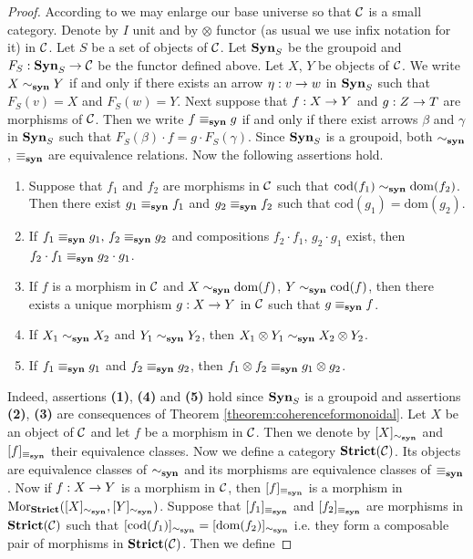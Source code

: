 \begin{proof}
According to {\cite[Introduction]{Presheaves}} we may enlarge our base universe so that ${\mathcal C}$ is a small category. Denote by $I$ unit and by $\otimes$ functor (as usual we use infix notation for it) in ${\mathcal C}$. Let $S$ be a set of objects of ${\mathcal C}$. Let $\mathbf{Syn}_S$ be the groupoid and $F_S:\mathbf{Syn}_S\rightarrow {\mathcal C}$ be the functor defined above. Let $X$, $Y$ be objects of ${\mathcal C}$. We write $X\sim_{\mathbf{syn}}Y$ if and only if there exists an arrow $\eta:v\rightarrow w$ in $\mathbf{Syn}_S$ such that $F_S(v)=X$ and $F_S(w)=Y$. Next suppose that $f:X\rightarrow Y$ and $g:Z\rightarrow T$ are morphisms of ${\mathcal C}$. Then we write $f \equiv_{\mathbf{syn}}g$ if and only if there exist arrows $\beta$ and $\gamma$ in $\mathbf{Syn}_S$ such that $F_S(\beta)\cdot f = g\cdot F_S(\gamma)$. Since $\mathbf{Syn}_S$ is a groupoid, both $\sim_{\mathbf{syn}}$, $\equiv_{\mathbf{syn}}$ are equivalence relations. Now the following assertions hold.
\begin{enumerate}[label=\textbf{(\arabic*)}, leftmargin=1.5em]
\item Suppose that $f_1$ and $f_2$ are morphisms in ${\mathcal C}$ such that $\mathrm{cod}(f_1) \sim_{\mathbf{syn}} \mathrm{dom}(f_2)$. Then there exist $g_1 \equiv_{\mathbf{syn}} f_1$ and $g_2\equiv_{\mathbf{syn}} f_2$ such that $\mathrm{cod}(g_1)=\mathrm{dom}(g_2)$. 
\item If $f_1\equiv_{\mathbf{syn}} g_1,\, f_2\equiv_{\mathbf{syn}} g_2$ and compositions $f_2\cdot f_1,\,g_2\cdot g_1$ exist, then $f_2\cdot f_1\equiv_{\mathbf{syn}}g_2\cdot g_1$.
\item If $f$ is a morphism in ${\mathcal C}$ and $X\sim_{\mathbf{syn}} \mathrm{dom}(f)$, $Y\sim_{\mathbf{syn}} \mathrm{cod}(f)$, then there exists a unique morphism $g:X\rightarrow Y$ in ${\mathcal C}$ such that $g \equiv_{\mathbf{syn}} f$.
\item If $X_1\sim_{\mathbf{syn}}X_2$ and $Y_1\sim_{\mathbf{syn}} Y_2$, then $X_1\otimes Y_1 \sim_{\mathbf{syn}} X_2\otimes Y_2$. 
\item If $f_1\equiv_{\mathbf{syn}} g_1$ and $f_2\equiv_{\mathbf{syn}} g_2$, then $f_1\otimes f_2 \equiv_{\mathbf{syn}} g_1\otimes g_2$.
\end{enumerate}
Indeed, assertions \textbf{(1)}, \textbf{(4)} and \textbf{(5)} hold since $\mathbf{Syn}_S$ is a groupoid and assertions \textbf{(2)}, \textbf{(3)} are consequences of Theorem \ref{theorem:coherenceformonoidal}. Let $X$ be an object of ${\mathcal C}$ and let $f$ be a morphism in ${\mathcal C}$. Then we denote by $[X]_{\sim_{\mathbf{syn}}}$ and $[f]_{\equiv_{\mathbf{syn}}}$ their equivalence classes. Now we define a category $\mathbf{Strict}({\mathcal C})$.  Its objects are equivalence classes of $\sim_{\mathbf{syn}}$ and its morphisms are equivalence classes of $\equiv_{\mathbf{syn}}$. Now if $f:X\rightarrow Y$ is a morphism in ${\mathcal C}$, then $[f]_{\equiv_{\mathbf{syn}}}$ is a morphism in $\mathrm{Mor}_{\mathbf{Strict}}([X]_{\sim_{\mathbf{syn}}},[Y]_{\sim_{\mathbf{syn}}})$. Suppose that $[f_1]_{\equiv_{\mathbf{syn}}}$ and $[f_2]_{\equiv_{\mathbf{syn}}}$ are morphisms in $\mathbf{Strict}({\mathcal C})$ such that $[\mathrm{cod}(f_1)]_{\sim_{\mathbf{syn}}} = [\mathrm{dom}(f_2)]_{\sim_{\mathbf{syn}}}$ i.e. they form a composable pair of morphisms in $\mathbf{Strict}({\mathcal C})$. Then we define

\end{proof}
